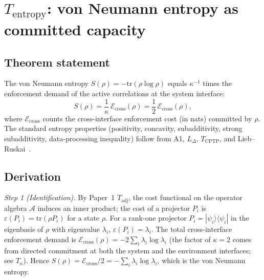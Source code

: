 \documentclass[11pt]{article}
\theoremstyle{remark}
\begin{document}
\section{$T_{\mathrm{entropy}}$: von Neumann entropy as committed capacity}
\label{sec:Tentropy}

\subsection{Theorem statement}

\begin{tcolorbox}[apfbox, title={Theorem 4.1 ($T_{\mathrm{entropy}}$)}]
The von Neumann entropy $S(\rho) = -\mathrm{tr}(\rho\log\rho)$ equals
$\kappa^{-1}$ times the enforcement demand of the active correlations at
the system interface:
\[
S(\rho) = \frac{1}{\kappa}\,\mathcal{E}_{\mathrm{cross}}(\rho) = \frac{1}{2}\,\mathcal{E}_{\mathrm{cross}}(\rho),
\]
where $\mathcal{E}_{\mathrm{cross}}$ counts the cross-interface enforcement
cost (in nats) committed by $\rho$.  The standard entropy properties
(positivity, concavity, subadditivity, strong subadditivity, data-processing
inequality) follow from A1, $L_\Delta$, $T_{\mathrm{CPTP}}$, and Lieb--Ruskai~\cite{LiebRuskai1973}.
\end{tcolorbox}

\subsection{Derivation}

\textit{Step 1 (Identification).}  By Paper~1 $T_{\mathrm{adj}}$, the
cost functional on the operator algebra $\mathcal{A}$ induces an inner
product; the cost of a projector $P_i$ is $\varepsilon(P_i) = \mathrm{tr}(\rho P_i)$
for a state $\rho$.  For a rank-one projector $P_i = |\psi_i\rangle\langle\psi_i|$
in the eigenbasis of $\rho$ with eigenvalue $\lambda_i$, $\varepsilon(P_i) = \lambda_i$.
The total cross-interface enforcement demand is
$\mathcal{E}_{\mathrm{cross}}(\rho) = -2 \sum_i \lambda_i \log \lambda_i$
(the factor of $\kappa = 2$ comes from directed commitment at both the
system and the environment interfaces; see $T_\kappa$).  Hence
$S(\rho) = \mathcal{E}_{\mathrm{cross}}/2 = -\sum_i \lambda_i \log \lambda_i$,
which is the von Neumann entropy.
\end{document}
